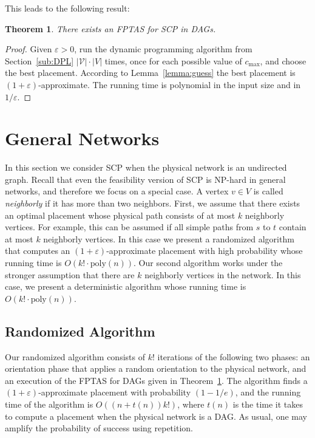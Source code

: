 \documentclass[11pt]{article}
\newtheorem{theorem}{Theorem}
\newcommand{\abs}[1]{\left| #1 \right|}
\newcommand{\eps}{\varepsilon}
\newcommand{\scp}{\textsc{SCP}\xspace}
\newcommand{\calV}{\mathcal{V}}
\begin{document}
This leads to the following result:

\begin{theorem}
\label{thm:fptas}
There exists an FPTAS for \scp in DAGs.
\end{theorem}
\begin{proof}
Given $\eps>0$, run the dynamic programming algorithm from
Section~\ref{sub:DPL} $\abs{\calV} \cdot \abs{V}$ times, once for each
possible value of $c_{\max}$, and choose the best placement.
According to Lemma~\ref{lemma:guess} the best placement is
$(1+\eps)$-approximate.  The running time is polynomial in the input
size and in $1/\eps$.
\end{proof}



\section{General Networks}
\label{sec:general}

In this section we consider \scp when the physical network is an
undirected graph.  Recall that even the feasibility version of \scp is
NP-hard in general networks, and therefore we focus on a special case.
%
A vertex $v \in V$ is called \emph{neighborly} if it has more than two
neighbors.
%
First, we assume that there exists an optimal placement whose physical
path consists of at most $k$ neighborly vertices.  For example, this
can be assumed if all simple paths from $s$ to $t$ contain at most $k$
neighborly vertices.  In this case we present a randomized algorithm
that computes an $(1+\eps)$-approximate placement with high
probability whose running time is $O(k! \cdot \text{poly}(n))$.
%
Our second algorithm works under the stronger assumption that there
are $k$ neighborly vertices in the network.  In this case, we present
a deterministic algorithm whose running time is $O(k! \cdot
\text{poly}(n))$.


\subsection{Randomized Algorithm}

Our randomized algorithm consists of $k!$ iterations of the following
two phases: an orientation phase that applies a random orientation to
the physical network, and an execution of the FPTAS for DAGs given in
Theorem~\ref{thm:fptas}.  The algorithm finds a $(1+\eps)$-approximate
placement with probability $(1-1/e)$, and the running time of the
algorithm is $O((n+t(n))k!)$, where $t(n)$ is the time it takes to
compute a placement when the physical network is a DAG.
%
As usual, one may amplify the probability of success using repetition.
\end{document}
